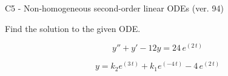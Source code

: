\begin{exercise}
  \begin{exerciseTitle}C5 - Non-homogeneous second-order linear ODEs (ver. 94)\end{exerciseTitle}
  \begin{exerciseStatement}
    
Find the solution to the given ODE.

    
\[y''+y'-12y = 24 \, e^{\left(2 \, t\right)}\]

  \end{exerciseStatement}
  \begin{exerciseAnswer}
    
\[y= k_{2} e^{\left(3 \, t\right)} + k_{1} e^{\left(-4 \, t\right)} - 4 \, e^{\left(2 \, t\right)}\]

  \end{exerciseAnswer}
\end{exercise}